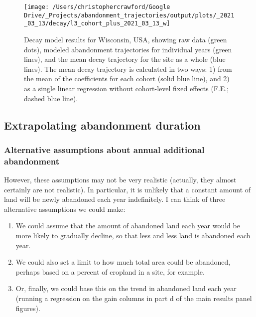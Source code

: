 \documentclass[
]{article}
\providecommand{\tightlist}{%
  \setlength{\itemsep}{0pt}\setlength{\parskip}{0pt}}
\begin{document}
\begin{figure}
\texttt{[image: /Users/christophercrawford/Google Drive/\_Projects/abandonment\_trajectories/output/plots/\_2021\_03\_13/decay/l3\_cohort\_plus\_2021\_03\_13\_w]} \caption{Decay model results for Wisconsin, USA, showing raw data (green dots), modeled abandonment trajectories for individual years (green lines), and the mean decay trajectory for the site as a whole (blue lines). The mean decay trajectory is calculated in two ways: 1) from the mean of the coefficients for each cohort (solid blue line), and 2) as a single linear regression without cohort-level fixed effects (F.E.; dashed blue line).}\label{fig:decay-model-indiv-site-w}
\end{figure}

\hypertarget{section-extrapolation-si}{%
\subsection{Extrapolating abandonment duration}\label{section-extrapolation-si}}

\hypertarget{alternative-assumptions-about-annual-additional-abandonment}{%
\subsubsection{Alternative assumptions about annual additional abandonment}\label{alternative-assumptions-about-annual-additional-abandonment}}

However, these assumptions may not be very realistic (actually, they almost certainly are not realistic).
In particular, it is unlikely that a constant amount of land will be newly abandoned each year indefinitely.
I can think of three alternative assumptions we could make:

\begin{enumerate}
\def\labelenumi{\arabic{enumi}.}
\tightlist
\item
  We could assume that the amount of abandoned land each year would be more likely to gradually decline, so that less and less land is abandoned each year.
\item
  We could also set a limit to how much total area could be abandoned, perhaps based on a percent of cropland in a site, for example.
\item
  Or, finally, we could base this on the trend in abandoned land each year (running a regression on the gain columns in part d of the main results panel figures).
\end{enumerate}
\end{document}
